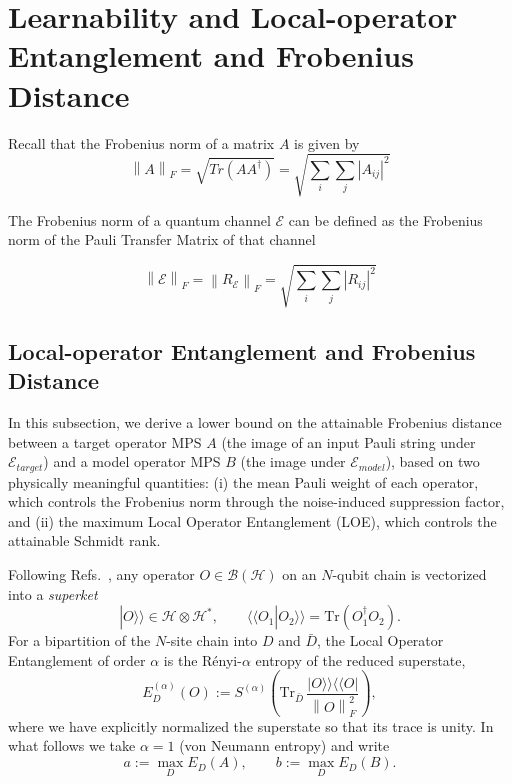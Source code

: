 \documentclass[%
 reprint,
superscriptaddress,
 amsmath,amssymb,
 aps,
]{revtex4-2}
\newcommand{\E}{\mathcal{E}}
\newcommand{\norm}[1]{\left\lVert#1\right\rVert}
\begin{document}
\section{Learnability and Local-operator Entanglement and Frobenius Distance}
\label{sec:learnability_and_entanglement_entropy}

Recall that the Frobenius norm of a matrix $A$ is given by 
\begin{equation}
\norm{A}_F=\sqrt{Tr(AA^\dagger)}=\sqrt{\sum_i\sum_j|A_{ij}|^2}
\end{equation}

The Frobenius norm of a quantum channel $\E$ can be defined as the Frobenius norm of the Pauli Transfer Matrix of that channel

\begin{equation}
    \norm{\E}_F=\norm{R_{\E}}_F=\sqrt{\sum_i\sum_j|R_{ij}|^2}
\end{equation}

\subsection{Local-operator Entanglement and Frobenius Distance}
\label{sec:LOE_Frobenius}

In this subsection, we derive a lower bound on the attainable Frobenius distance between a target operator MPS $A$ (the image of an input Pauli string under $\E_{target}$) and a model operator MPS $B$ (the image under $\E_{model}$), based on two physically meaningful quantities: (i) the mean Pauli weight of each operator, which controls the Frobenius norm through the noise-induced suppression factor, and (ii) the maximum Local Operator Entanglement (LOE), which controls the attainable Schmidt rank.

Following Refs.~\cite{zanardi2001entanglement,prosen2007operator}, any operator $O\in\mathcal{B}(\mathcal{H})$ on an $N$-qubit chain is vectorized into a \emph{superket}
\begin{equation}
    |O\rangle\rangle \in \mathcal{H}\otimes\mathcal{H}^*,\qquad \langle\langle O_1|O_2\rangle\rangle = \mathrm{Tr}(O_1^\dagger O_2).
\end{equation}
For a bipartition of the $N$-site chain into $D$ and $\bar D$, the Local Operator Entanglement of order $\alpha$ is the R\'enyi-$\alpha$ entropy of the reduced superstate,
\begin{equation}
    E^{(\alpha)}_{D}(O) := S^{(\alpha)}\!\left(\mathrm{Tr}_{\bar{D}}\,\frac{|O\rangle\rangle\langle\langle O|}{\norm{O}_F^2}\right),
\end{equation}
where we have explicitly normalized the superstate so that its trace is unity. In what follows we take $\alpha=1$ (von Neumann entropy) and write
\begin{equation}
    a := \max_D E_D(A),\qquad b := \max_D E_D(B).
\end{equation}
\end{document}
